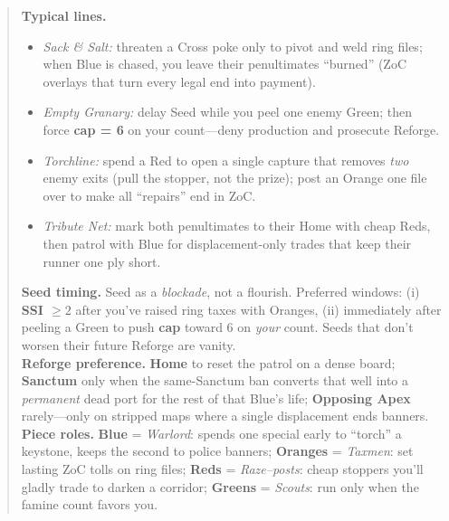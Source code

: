 \documentclass[11pt]{article}
\begin{document}
\begin{quote}
\noindent\textbf{Typical lines.}
\begin{itemize}\itemsep0.2em
  \item \emph{Sack \& Salt:} threaten a Cross poke only to pivot and weld ring files; when Blue is chased, you leave their penultimates “burned” (ZoC overlays that turn every legal end into payment).
  \item \emph{Empty Granary:} delay Seed while you peel one enemy Green; then force \textbf{cap = 6} on your count—deny production and prosecute Reforge.
  \item \emph{Torchline:} spend a Red to open a single capture that removes \emph{two} enemy exits (pull the stopper, not the prize); post an Orange one file over to make all “repairs” end in ZoC.
  \item \emph{Tribute Net:} mark both penultimates to their Home with cheap Reds, then patrol with Blue for displacement-only trades that keep their runner one ply short.
\end{itemize}

\noindent\textbf{Seed timing.} Seed as a \emph{blockade}, not a flourish. Preferred windows: (i) \textbf{SSI $\ge 2$} after you’ve raised ring taxes with Oranges, (ii) immediately after peeling a Green to push \textbf{cap} toward $6$ on \emph{your} count. Seeds that don’t worsen their future Reforge are vanity.\\

\noindent\textbf{Reforge preference.} \textbf{Home} to reset the patrol on a dense board; \textbf{Sanctum} only when the same-Sanctum ban converts that well into a \emph{permanent} dead port for the rest of that Blue’s life; \textbf{Opposing Apex} rarely—only on stripped maps where a single displacement ends banners.\\

\noindent\textbf{Piece roles.} \textbf{Blue} = \emph{Warlord}: spends one special early to “torch” a keystone, keeps the second to police banners; \textbf{Oranges} = \emph{Taxmen}: set lasting ZoC tolls on ring files; \textbf{Reds} = \emph{Raze–posts}: cheap stoppers you’ll gladly trade to darken a corridor; \textbf{Greens} = \emph{Scouts}: run only when the famine count favors you.\\[0.25em]


\end{quote}
\end{document}
